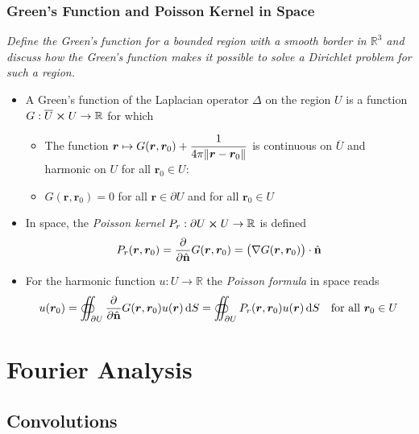 \documentclass[11pt, a4paper]{article}
\newcommand{\question}[1]{\textit{#1}\vspace{2mm}}
\renewcommand{\grad}{\nabla}
\newcommand{\R}{\mathbb{R}} %
\newcommand{\diff}{\mathop{}\!\mathrm{d}} %
\newcommand{\nhat}{\hat{\mathbf{n}}} %
\begin{document}
\subsubsection{Green's Function and Poisson Kernel in Space}
\question{Define the Green's function for a bounded region with a smooth border in $ \R^{3} $ and discuss how the Green's function makes it possible to solve a Dirichlet problem for such a region.}

\begin{itemize}
	\item A Green's function of the Laplacian operator $ \Delta $ on the region $ U $ is a function $ G : \overline{U} \cross U \to \R $ for which
	\begin{itemize}
		\item The function $ \displaystyle{\bm{r} \mapsto G(\bm{r}, \bm{r}_0) + \frac{1}{4\pi \norm{\bm{r} - \bm{r}_0}}   } $ is continuous on $ \overline{U} $ and harmonic on $ U $ for all $ \bm{r}_0 \in U $:
		\item $ G(\bm{r}, \bm{r}_0) = 0 $ for all $ \bm{r} \in \partial U $ and for all $ \bm{r}_{0} \in U $
	\end{itemize}
	
	\item In space, the \textit{Poisson kernel} $ P_r : \partial U \cross U \to  \R $ is defined 
	\begin{equation*}
		P_r(\bm{r}, \bm{r}_0) = \pdv{}{\nhat} G(\bm{r}, \bm{r}_0)  = \big(\grad{G(\bm{r}, \bm{r}_0)} \big)\cdot \nhat
	\end{equation*}
		
	\item For the harmonic function $ u: U \to \R $ the \textit{Poisson formula} in space reads
	\begin{equation*}
		u(\bm{r}_0) = \oiint_{\partial U} \pdv{}{\nhat} G(\bm{r}, \bm{r}_0) u(\bm{r}) \diff S = \oiint_{\partial U} P_r(\bm{r}, \bm{r}_0) u(\bm{r}) \diff S \quad \text{for all } \bm{r}_{0} \in U
	\end{equation*}
	
\end{itemize}


\section{Fourier Analysis}
\subsection{Convolutions}
\end{document}
